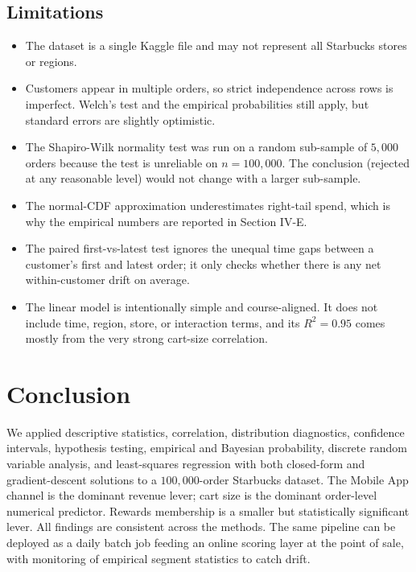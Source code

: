 \documentclass[conference,10pt]{IEEEtran}
\begin{document}
\subsection{Limitations}
\begin{itemize}\itemsep2pt
\item The dataset is a single Kaggle file and may not represent all Starbucks stores or regions.
\item Customers appear in multiple orders, so strict independence across rows is imperfect. Welch's test and the empirical probabilities still apply, but standard errors are slightly optimistic.
\item The Shapiro\nobreakdash-Wilk normality test was run on a random sub\nobreakdash-sample of $5{,}000$ orders because the test is unreliable on $n=100{,}000$. The conclusion (rejected at any reasonable level) would not change with a larger sub\nobreakdash-sample.
\item The normal\nobreakdash-CDF approximation underestimates right\nobreakdash-tail spend, which is why the empirical numbers are reported in Section IV-E.
\item The paired first\nobreakdash-vs\nobreakdash-latest test ignores the unequal time gaps between a customer's first and latest order; it only checks whether there is any net within\nobreakdash-customer drift on average.
\item The linear model is intentionally simple and course\nobreakdash-aligned. It does not include time, region, store, or interaction terms, and its $R^2{=}0.95$ comes mostly from the very strong cart\nobreakdash-size correlation.
\end{itemize}

\section{Conclusion}
We applied descriptive statistics, correlation, distribution diagnostics, confidence intervals, hypothesis testing, empirical and Bayesian probability, discrete random variable analysis, and least\nobreakdash-squares regression with both closed\nobreakdash-form and gradient\nobreakdash-descent solutions to a $100{,}000$\nobreakdash-order Starbucks dataset. The Mobile App channel is the dominant revenue lever; cart size is the dominant order\nobreakdash-level numerical predictor. Rewards membership is a smaller but statistically significant lever. All findings are consistent across the methods. The same pipeline can be deployed as a daily batch job feeding an online scoring layer at the point of sale, with monitoring of empirical segment statistics to catch drift.
\end{document}
